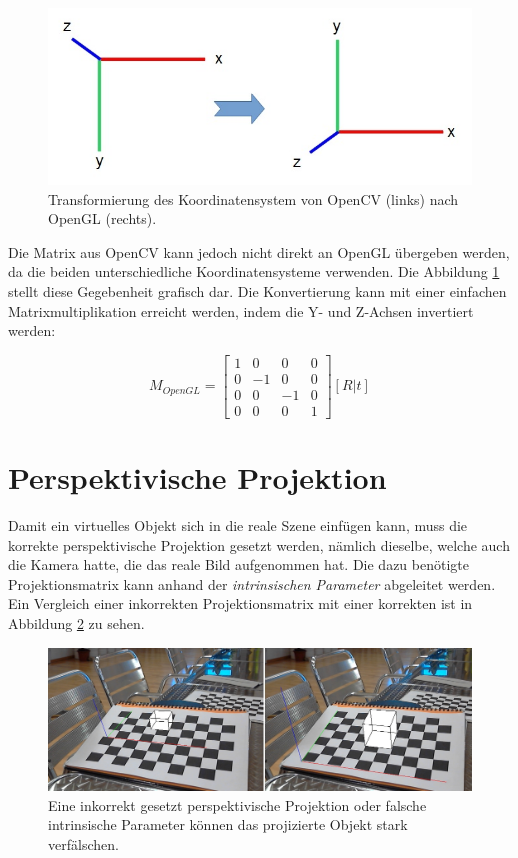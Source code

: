 \begin{figure}[!ht]
\centering
\includegraphics[scale=0.5]{images/opencv-to-opengl.jpg} 
\caption{Transformierung des Koordinatensystem von OpenCV (links) nach OpenGL (rechts).}
\label{fig:opencv-to-opengl}
\end{figure}

\noindent
Die Matrix aus OpenCV kann jedoch nicht direkt an OpenGL übergeben werden, da die beiden unterschiedliche Koordinatensysteme verwenden. Die Abbildung \ref{fig:opencv-to-opengl} stellt diese Gegebenheit grafisch dar. Die Konvertierung kann mit einer einfachen Matrixmultiplikation erreicht werden, indem die Y- und Z-Achsen invertiert werden:

\begin{equation}
M_{OpenGL}
=
\begin{bmatrix}
1 & 0 & 0 & 0 \\
0 & -1 & 0 & 0 \\
0 & 0 & -1 & 0 \\
0 & 0 & 0 & 1
\end{bmatrix} 
[R | t]
\end{equation}

 
\section{Perspektivische Projektion}

Damit ein virtuelles Objekt sich in die reale Szene einfügen kann, muss die korrekte perspektivische Projektion gesetzt werden, nämlich dieselbe, welche auch die Kamera hatte, die das reale Bild aufgenommen hat. Die dazu benötigte Projektionsmatrix kann anhand der \textit{intrinsischen Parameter} abgeleitet werden. Ein Vergleich einer inkorrekten Projektionsmatrix mit einer korrekten ist in Abbildung \ref{fig:opengl-perspektive} zu sehen.


\begin{figure}[!ht]
\centering
\includegraphics[scale=0.5]{images/opengl-perspective.jpg} 
\caption{Eine inkorrekt gesetzt perspektivische Projektion oder falsche intrinsische Parameter können das projizierte Objekt stark verfälschen.}
\label{fig:opengl-perspektive}
\end{figure}


